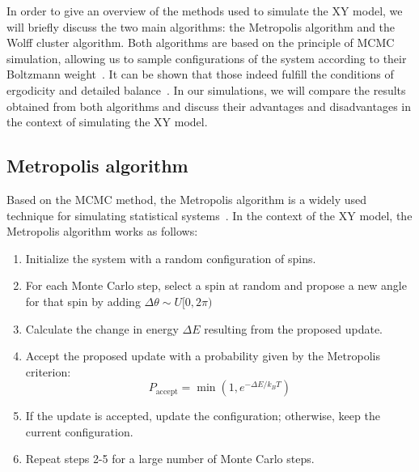 In order to give an overview of the methods used to simulate the XY model, we will briefly discuss the two main algorithms: the Metropolis algorithm and the Wolff cluster algorithm.
Both algorithms are based on the principle of MCMC simulation, allowing us to sample configurations of the system according to their Boltzmann weight~\cite{Metropolis1949}.
It can be shown that those indeed fulfill the conditions of ergodicity and detailed balance~\cite{PetschliesUrbach2026,Wolff1989}.
In our simulations, we will compare the results obtained from both algorithms and discuss their advantages and disadvantages in the context of simulating the XY model.

\subsection{Metropolis algorithm}
Based on the MCMC method, the Metropolis algorithm is a widely used technique for simulating statistical systems~\cite{Metropolis1949}.
In the context of the XY model, the Metropolis algorithm works as follows:

\begin{enumerate}
  \item Initialize the system with a random configuration of spins.
  \item For each Monte Carlo step, select a spin at random and propose a new angle for that spin by adding $\Delta \theta \sim U[0, 2\pi)$
  \item Calculate the change in energy $\Delta E$ resulting from the proposed update.
  \item Accept the proposed update with a probability given by the Metropolis criterion:
  \begin{equation}
    P_{\text{accept}} = \min\left(1, e^{-\Delta E / k_B T}\right)
  \end{equation}
  \item If the update is accepted, update the configuration; otherwise, keep the current configuration.
  \item Repeat steps 2-5 for a large number of Monte Carlo steps.
\end{enumerate}


